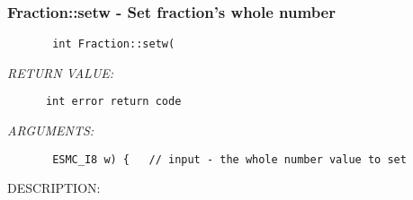  
\setlength{\oldparskip}{\parskip}
\setlength{\parskip}{1.5ex}
\setlength{\oldparindent}{\parindent}
\setlength{\parindent}{0pt}
\setlength{\oldbaselineskip}{\baselineskip}
\setlength{\baselineskip}{11pt}
 
\def\bv{\begin{verbatim}}
\def\ev{\end{verbatim}}
\def\be{\begin{equation}}
\def\ee{\end{equation}}
\def\bea{\begin{eqnarray}}
\def\eea{\end{eqnarray}}
\def\bi{\begin{itemize}}
\def\ei{\end{itemize}}
\def\bn{\begin{enumerate}}
\def\en{\end{enumerate}}
\def\bd{\begin{description}}
\def\ed{\end{description}}
\def\({\left (}
\def\){\right )}
\def\[{\left [}
\def\]{\right ]}
\def\<{\left  \langle}
\def\>{\right \rangle}
\def\cI{{\cal I}}
\def\diag{\mathop{\rm diag}}
\def\tr{\mathop{\rm tr}}


 
\subsubsection [Fraction::setw] {Fraction::setw - Set fraction's whole number}


  
\begin{verbatim}       int Fraction::setw(\end{verbatim}{\em RETURN VALUE:}
\begin{verbatim}      int error return code\end{verbatim}{\em ARGUMENTS:}
\begin{verbatim}       ESMC_I8 w) {   // input - the whole number value to set\end{verbatim}
{\sf DESCRIPTION:\\ }


